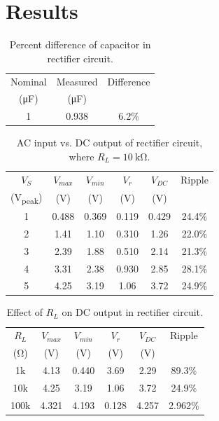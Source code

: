 \documentclass{article}
\begin{document}
\section{Results}
\label{sec:results}

\begin{table}[hbtp]
  \centering
  \begin{tabular}{ccc}
    Nominal             & Measured            & Difference \\
    (\si{\micro\farad}) & (\si{\micro\farad}) &            \\
    \hline
    1                   & 0.938               & 6.2\%      \\
  \end{tabular}
  \caption{\label{tab:cap} Percent difference of capacitor in rectifier circuit.}
\end{table}

\begin{table}[hbtp]
  \centering
  \begin{tabular}{cccccc}
    $V_S$           & $V_{max}$ & $V_{min}$ & $V_r$    & $V_{DC}$ & Ripple \\
    (\si{V_{peak}}) & (\si{V})  & (\si{V})  & (\si{V}) & (\si{V}) &        \\
    \hline
    1               & 0.488     & 0.369     & 0.119    & 0.429    & 24.4\% \\
    2               & 1.41      & 1.10      & 0.310    & 1.26     & 22.0\% \\
    3               & 2.39      & 1.88      & 0.510    & 2.14     & 21.3\% \\
    4               & 3.31      & 2.38      & 0.930    & 2.85     & 28.1\% \\
    5               & 4.25      & 3.19      & 1.06     & 3.72     & 24.9\% \\
  \end{tabular}
  \caption{\label{tab:rect_vp_vdc} AC input vs. DC output of rectifier circuit, where $R_L=\SI{10}{\kilo\ohm}$.}
\end{table}

\begin{table}[hbtp]
  \centering
  \begin{tabular}{cccccc}
    $R_L$       & $V_{max}$ & $V_{min}$ & $V_r$    & $V_{DC}$ & Ripple  \\
    (\si{\ohm}) & (\si{V})  & (\si{V})  & (\si{V}) & (\si{V}) &         \\
    \hline
    1k          & 4.13      & 0.440     & 3.69     & 2.29     & 89.3\%  \\
    10k         & 4.25      & 3.19      & 1.06     & 3.72     & 24.9\%  \\
    100k        & 4.321     & 4.193     & 0.128    & 4.257    & 2.962\% \\
  \end{tabular}
  \caption{\label{tab:load_v_ripple} Effect of $R_L$ on DC output in rectifier circuit.}
\end{table}
\end{document}
